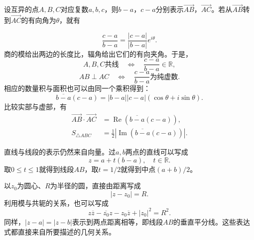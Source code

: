 \begin{samepage}
设互异的点\(A , B , C\)对应复数\(a , b , c\)，则\(b - a\)，\(c - a\)分别表示\(\vec{A B}\)，\(\vec{A C}\)。若从\(\vec{A B}\)转到\(\vec{A C}\)的有向角为\(\theta\)，就有
\par
\end{samepage}
\begin{equation}
    \frac{c - a}{b - a} = \frac{\left| c - a \right|}{\left| b - a \right|} e^{i \theta} .
\end{equation}
商的模给出两边的长度比，辐角给出它们的有向夹角。于是，
\begin{equation}
    A , B , C\text{共线} \quad \Longleftrightarrow \quad \frac{c - a}{b - a} \in \mathbb{R} ,
\end{equation}
\begin{equation}
    A B \perp A C \quad \Longleftrightarrow \quad \frac{c - a}{b - a}\text{为纯虚数} .
\end{equation}
相应的数量积与面积也可以由同一个乘积得到：
\begin{equation}
    \overline{b - a} \left( c - a \right)
    = \left| b - a \right| \left| c - a \right| \left( \cos \theta + i \sin \theta \right) .
\end{equation}
比较实部与虚部，有
\begin{align}
    \vec{A B} \cdot \vec{A C} &= \operatorname{Re} \left( \overline{b - a} \left( c - a \right) \right) , \\
    S_{\triangle A B C} &= \frac{1}{2} \left| \operatorname{Im} \left( \overline{b - a} \left( c - a \right) \right) \right| .
\end{align}

直线与线段的表示仍然来自向量。过\(a , b\)两点的直线可以写成
\begin{equation}
    z = a + t \left( b - a \right) , \quad t \in \mathbb{R} .
\end{equation}
取\(0 \le t \le 1\)就得到线段\(A B\)，取\(t = 1 / 2\)就得到中点\(\left( a + b \right) / 2\)。

以\(z_{0}\)为圆心、\(R\)为半径的圆，直接由距离写成
\begin{equation}
    \left| z - z_{0} \right| = R .
\end{equation}
利用模与共轭的关系，也可以写成
\begin{equation}
    z \overline{z} - \overline{z_{0}} z - z_{0} \overline{z} + \left| z_{0} \right|^{2} = R^{2} .
\end{equation}
同样，\(\left| z - a \right| = \left| z - b \right|\)表示到两点距离相等，即线段\(A B\)的垂直平分线。这些表达式都直接来自所要描述的几何关系。

